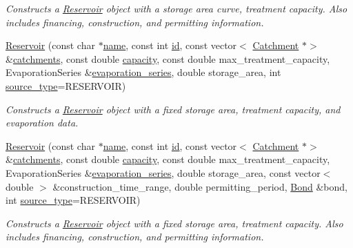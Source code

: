 \begin{DoxyCompactItemize}
\begin{DoxyCompactList}\small\item\em Constructs a \mbox{\hyperlink{classReservoir}{Reservoir}} object with a storage area curve, treatment capacity. Also includes financing, construction, and permitting information. \end{DoxyCompactList}\item 
\mbox{\hyperlink{classReservoir_a0a1041fc72df190bbc51d965ede96f49}{Reservoir}} (const char $\ast$\mbox{\hyperlink{classWaterSource_a846ea74c5b453d014f594d41fee8c765}{name}}, const int \mbox{\hyperlink{classWaterSource_a6eafe5dfefd317877d1244e8a7c6e742}{id}}, const vector$<$ \mbox{\hyperlink{classCatchment}{Catchment}} $\ast$$>$ \&\mbox{\hyperlink{classWaterSource_a8c18c34f23f8a06685c1d12f462ed830}{catchments}}, const double \mbox{\hyperlink{classWaterSource_a2ec257b415b248214a8bce7fc5267723}{capacity}}, const double max\+\_\+treatment\+\_\+capacity, Evaporation\+Series \&\mbox{\hyperlink{classReservoir_a2d2d9b302c13703309bb798d24136810}{evaporation\+\_\+series}}, double storage\+\_\+area, int \mbox{\hyperlink{classWaterSource_afdd12c29fc74ea21dff1f1be9b8c2b7b}{source\+\_\+type}}=R\+E\+S\+E\+R\+V\+O\+IR)
\begin{DoxyCompactList}\small\item\em Constructs a \mbox{\hyperlink{classReservoir}{Reservoir}} object with a fixed storage area, treatment capacity, and evaporation data. \end{DoxyCompactList}\item 
\mbox{\hyperlink{classReservoir_a56409325d4554f8ef32a9c3605ece5c8}{Reservoir}} (const char $\ast$\mbox{\hyperlink{classWaterSource_a846ea74c5b453d014f594d41fee8c765}{name}}, const int \mbox{\hyperlink{classWaterSource_a6eafe5dfefd317877d1244e8a7c6e742}{id}}, const vector$<$ \mbox{\hyperlink{classCatchment}{Catchment}} $\ast$$>$ \&\mbox{\hyperlink{classWaterSource_a8c18c34f23f8a06685c1d12f462ed830}{catchments}}, const double \mbox{\hyperlink{classWaterSource_a2ec257b415b248214a8bce7fc5267723}{capacity}}, const double max\+\_\+treatment\+\_\+capacity, Evaporation\+Series \&\mbox{\hyperlink{classReservoir_a2d2d9b302c13703309bb798d24136810}{evaporation\+\_\+series}}, double storage\+\_\+area, const vector$<$ double $>$ \&construction\+\_\+time\+\_\+range, double permitting\+\_\+period, \mbox{\hyperlink{classBond}{Bond}} \&bond, int \mbox{\hyperlink{classWaterSource_afdd12c29fc74ea21dff1f1be9b8c2b7b}{source\+\_\+type}}=R\+E\+S\+E\+R\+V\+O\+IR)
\begin{DoxyCompactList}\small\item\em Constructs a \mbox{\hyperlink{classReservoir}{Reservoir}} object with a fixed storage area, treatment capacity. Also includes financing, construction, and permitting information. \end{DoxyCompactList}\item 

\end{DoxyCompactItemize}
